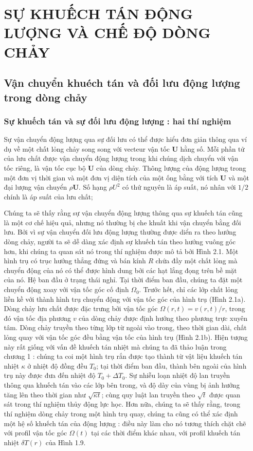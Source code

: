 \documentclass[THUY_DONG_HOC.tex]{subfiles}
\begin{document}
\chapter{SỰ KHUẾCH TÁN ĐỘNG LƯỢNG VÀ CHẾ ĐỘ DÒNG CHẢY}
\section{Vận chuyển khuéch tán và đối lưu động lượng trong dòng chảy}
\subsection{Sự khuếch tán và sự đối lưu động lượng : hai thí nghiệm}
Sự vận chuyển động lượng qua sự đối lưu có thể được hiểu đơn giản thông qua ví dụ về một chất lỏng chảy song song với vecteur vận tốc $\textbf{U}$ hằng số. Mỗi phần tử của lưu chất được vận chuyển động lượng trong khi chúng dịch chuyển với vận tốc riêng, là vận tốc cục bộ $\textbf{U}$ của dòng chảy. Thông lượng của động lượng trong một đơn vị thời gian và một đơn vị diện tích của một ống bằng với tích $\textbf{U}$ và một đại lượng vận chuyển $\rho\textbf{U}$. Số hạng $\rho U^2$ có thứ nguyên là áp suất, nó nhân với $1/2$ chính là áp suất của lưu chất;

Chúng ta sẽ thấy rằng sự vận chuyển động lượng thông qua sự khuếch tán cũng là một cơ chế hiệu quả, nhưng nó thường bị che khuất khi vận chuyển bằng đối lưu. Bởi vì sự vận chuyển đối lưu động lượng thường được diển ra theo hướng dòng chảy, người ta sẽ dễ dàng xác định sự khuếch tán theo hướng vuông góc hơn, khi chúng ta quan sát nó trong thí nghiệm được mô tả bởi Hình 2.1. Một hình trụ có trục hướng thẳng đứng và bán kính $R$ chứa đầy một chất lỏng mà chuyển động của nó có thể được hình dung bởi các hạt lắng đọng trên bề mặt của nó. Hệ ban đầu ở trạng thái nghỉ. Tại thời điểm ban đầu, chúng ta đặt một chuyển động xoay với vận tốc góc cố định $\Omega_0$. Trước hết, chỉ các lớp chất lỏng liền kề với thành hình trụ chuyển động với vận tốc góc của hình trụ (Hình 2.1a). Dòng chảy lưu chất được đặc trưng bởi vận tốc góc $\Omega(r,t)=v(r,t)/r$, trong đó vận tốc địa phương $v$ của dòng chảy được định hướng theo phương trực xuyên tâm. Dòng chảy truyền theo từng lớp từ ngoài vào trong, theo thời gian dài, chất lỏng quay với vận tốc góc đều bằng vận tốc của hình trụ (Hình 2.1b). Hiện tượng này rất giống với vấn đề khuếch tán nhiệt mà chúng ta đã thảo luận trong chương 1 : chúng ta coi một hình trụ rắn được tạo thành từ vật liệu khuếch tán nhiệt $\kappa$ ở nhiệt độ đồng đều $T_0$; tại thời điểm ban đầu, thành bên ngoài của hình trụ này được đưa đến nhiệt độ $T_0 + \Delta T_0$. Sự nhiễu loạn nhiệt độ lan truyền thông qua khuếch tán vào các lớp bên trong, và độ dày của vùng bị ảnh hưởng tăng lên theo thời gian như $\sqrt{\kappa t}$; cùng quy luật lan truyền theo $\sqrt{t}$ được quan sát trong thí nghiệm thủy động lực học. Hơn nữa, chúng ta sẽ thấy rằng, trong thí nghiệm dòng chảy trong một hình trụ quay, chúng ta cũng có thể xác định một hệ số khuếch tán của động lượng : điều này làm cho nó tương thích chặt chẽ với profil vận tốc góc $\Omega(t)$ tại các thời điểm khác nhau, với profil khuếch tán nhiệt $\delta T(r)$ của Hình 1.9.
\end{document}
